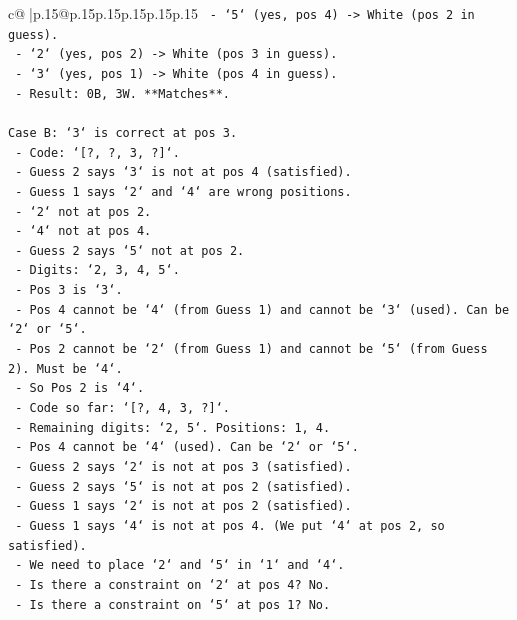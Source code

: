 \documentclass{article}
\begin{document}
{\begin{supertabular}{c@{$\;$}|p{.15\linewidth}@{}p{.15\linewidth}p{.15\linewidth}p{.15\linewidth}p{.15\linewidth}p{.15\linewidth}}
{{{\texttt{       {-} `5` (yes, pos 4) {-}> White (pos 2 in guess).} \\
\texttt{       {-} `2` (yes, pos 2) {-}> White (pos 3 in guess).} \\
\texttt{       {-} `3` (yes, pos 1) {-}> White (pos 4 in guess).} \\
\texttt{       {-} Result: 0B, 3W. **Matches**.} \\
\\ 
\texttt{Case B: `3` is correct at pos 3.} \\
\texttt{   {-} Code: `{[}?, ?, 3, ?{]}`.} \\
\texttt{   {-} Guess 2 says `3` is not at pos 4 (satisfied).} \\
\texttt{   {-} Guess 1 says `2` and `4` are wrong positions.} \\
\texttt{     {-} `2` not at pos 2.} \\
\texttt{     {-} `4` not at pos 4.} \\
\texttt{   {-} Guess 2 says `5` not at pos 2.} \\
\texttt{   {-} Digits: `2, 3, 4, 5`.} \\
\texttt{   {-} Pos 3 is `3`.} \\
\texttt{   {-} Pos 4 cannot be `4` (from Guess 1) and cannot be `3` (used). Can be `2` or `5`.} \\
\texttt{   {-} Pos 2 cannot be `2` (from Guess 1) and cannot be `5` (from Guess 2). Must be `4`.} \\
\texttt{   {-} So Pos 2 is `4`.} \\
\texttt{   {-} Code so far: `{[}?, 4, 3, ?{]}`.} \\
\texttt{   {-} Remaining digits: `2, 5`. Positions: 1, 4.} \\
\texttt{   {-} Pos 4 cannot be `4` (used). Can be `2` or `5`.} \\
\texttt{   {-} Guess 2 says `2` is not at pos 3 (satisfied).} \\
\texttt{   {-} Guess 2 says `5` is not at pos 2 (satisfied).} \\
\texttt{   {-} Guess 1 says `2` is not at pos 2 (satisfied).} \\
\texttt{   {-} Guess 1 says `4` is not at pos 4. (We put `4` at pos 2, so satisfied).} \\
\texttt{   {-} We need to place `2` and `5` in `1` and `4`.} \\
\texttt{   {-} Is there a constraint on `2` at pos 4? No.} \\
\texttt{   {-} Is there a constraint on `5` at pos 1? No.} \\
}}}
\end{supertabular}}
\end{document}
